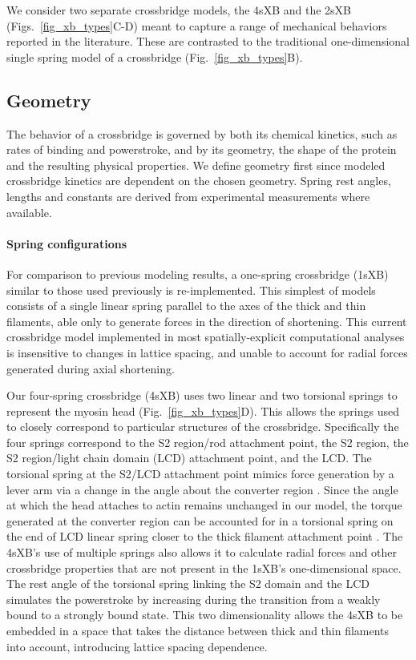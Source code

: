 \documentclass[]{article}
\begin{document}
We consider two separate crossbridge models, the 4sXB and the 2sXB (Figs.~\ref{fig_xb_types}C-D) meant to capture a range of mechanical behaviors reported in the literature.  
These are contrasted to the traditional one-dimensional single spring model of a crossbridge (Fig.~\ref{fig_xb_types}B).

\subsection*{Geometry} %

The behavior of a crossbridge is governed by both its chemical kinetics, such as rates of binding and powerstroke, and by its geometry, the shape of the protein and the resulting physical properties.
We define geometry first since modeled crossbridge kinetics are dependent on the chosen geometry.
Spring rest angles, lengths and constants are derived from experimental measurements where available.

\paragraph{Spring configurations} %
For comparison to previous modeling results, a one-spring crossbridge (1sXB) similar to those used previously is re-implemented.
This simplest of models consists of a single linear spring parallel to the axes of the thick and thin filaments, able only to generate forces in the direction of shortening. 
This current crossbridge model implemented in most spatially-explicit computational analyses \citep{Daniel1998, Chase:2004:p204, Tanner2007} is insensitive to changes in lattice spacing, and unable to account for radial forces generated during axial shortening.

Our four-spring crossbridge (4sXB) uses two linear and two torsional springs to represent the myosin head (Fig.~\ref{fig_xb_types}D).
This allows the springs used to closely correspond to particular structures of the crossbridge.
Specifically the four springs correspond to the S2 region/rod attachment point, the S2 region, the S2 region/light chain domain (LCD) attachment point, and the LCD. 
The torsional spring at the S2/LCD attachment point mimics force generation by a lever arm via a change in the angle about the converter region \citep{Houdusse2000, Houdusse2001}. 
Since the angle at which the head attaches to actin remains unchanged in our model, the torque generated at the converter region can be accounted for in a torsional spring on the end of LCD linear spring closer to the thick filament attachment point \citep{Lauzon2001}. %
The 4sXB's use of multiple springs also allows it to calculate radial forces and other crossbridge properties that are not present in the 1sXB's one-dimensional space. 
The rest angle of the torsional spring linking the S2 domain and the LCD simulates the powerstroke by increasing during the transition from a weakly bound to a strongly bound state.
This two dimensionality allows the 4sXB to be embedded in a space that takes the distance between thick and thin filaments into account, introducing lattice spacing dependence.
\end{document}
